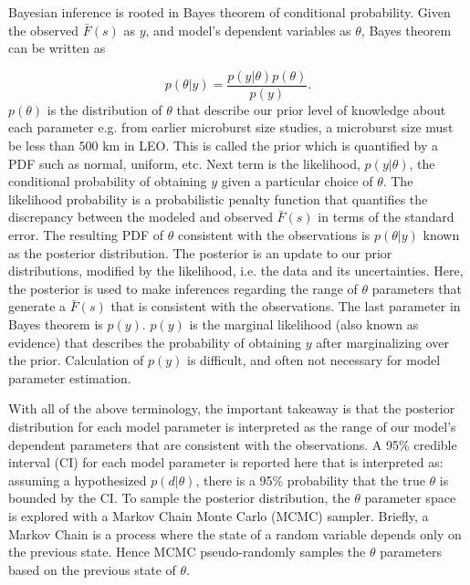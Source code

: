 \documentclass[draft]{agujournal2019}
\begin{document}
Bayesian inference is rooted in Bayes theorem of conditional probability. Given the observed $\bar{F}(s)$ as $y$, and model's dependent variables as $\theta$, Bayes theorem can be written as

\begin{equation}
p(\theta | y) = \frac{p(y | \theta) p(\theta)}{p(y)}.
\end{equation} $p(\theta)$ is the distribution of $\theta$ that describe our prior level of knowledge about each parameter e.g. from earlier microburst size studies, a microburst size must be less than $500$ km in LEO. This is called the prior which is quantified by a PDF such as normal, uniform, etc. Next term is the likelihood, $p(y | \theta)$, the conditional probability of obtaining $y$ given a particular choice of $\theta$. The likelihood probability is a probabilistic penalty function that quantifies the discrepancy between the modeled and observed $\bar{F}(s)$ in terms of the standard error. The resulting PDF of $\theta$ consistent with the observations is $p(\theta | y)$ known as the posterior distribution. The posterior is an update to our prior distributions, modified by the likelihood, i.e. the data and its uncertainties. Here, the posterior is used to make inferences regarding the range of $\theta$ parameters that generate a $\bar{F}(s)$ that is consistent with the observations. The last parameter in Bayes theorem is $p(y)$. $p(y)$ is the marginal likelihood (also known as evidence) that describes the probability of obtaining $y$ after marginalizing over the prior. Calculation of $p(y)$ is difficult, and often not necessary for model parameter estimation. 

With all of the above terminology, the important takeaway is that the posterior distribution for each model parameter is interpreted as the range of our model's dependent parameters that are consistent with the observations. A 95\% credible interval (CI) for each model parameter is reported here that is interpreted as: assuming a hypothesized $p(d | \theta)$, there is a 95\% probability that the true $\theta$ is bounded by the CI. To sample the posterior distribution, the $\theta$ parameter space is explored with a Markov Chain Monte Carlo (MCMC) sampler. Briefly, a Markov Chain is a process where the state of a random variable depends only on the previous state. Hence MCMC pseudo-randomly samples the $\theta$ parameters based on the previous state of $\theta$. 
\end{document}
